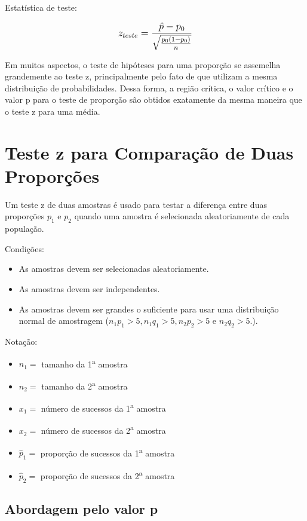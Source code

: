 Estatística de teste:

 \[\beq{ z_{teste} = \frac{\hat{p}-p_0}{\sqrt{\frac{p_0(1-p_0)}{n}}} }\]
 
Em muitos aspectos, o teste de hipóteses para uma proporção se assemelha grandemente ao teste z, principalmente pelo fato de que utilizam a mesma distribuição de probabilidades. Dessa forma, a região crítica, o valor crítico e o valor p para o teste de proporção são obtidos exatamente da mesma maneira que o teste z para uma média.

\section{Teste z para Comparação de Duas Proporções}

Um teste z de duas amostras é usado para testar a diferença entre duas proporções \(p_1\) e \(p_2\) quando uma amostra é selecionada aleatoriamente de cada população.

Condições:
\begin{itemize}
	\item As amostras devem ser selecionadas aleatoriamente.
	\item As amostras devem ser independentes.
	\item As amostras devem ser grandes o suficiente para usar uma distribuição normal de amostragem (\( n_1p_1 > 5, n_1q_1 > 5, n_2p_2 > 5 \) e \( n_2q_2 > 5. \)).
\end{itemize}

Notação:
\begin{itemize}
	\item \(n_1 = \) tamanho da 1\textsuperscript{a} amostra
	\item \(n_2 = \) tamanho da 2\textsuperscript{a} amostra
	\item \(x_1 = \) número de sucessos da 1\textsuperscript{a} amostra	
	\item \(x_2 = \) número de sucessos da 2\textsuperscript{a} amostra		
	\item \(\hat{p}_1 = \) proporção de sucessos da 1\textsuperscript{a} amostra	
	\item \(\hat{p}_2 = \) proporção de sucessos da 2\textsuperscript{a} amostra		
\end{itemize}

\subsection{Abordagem pelo valor p}

